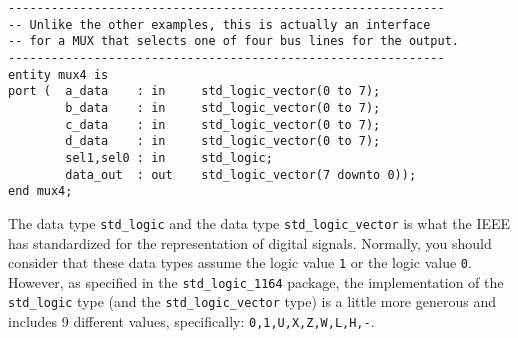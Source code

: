 \noindent
\begin{minipage}{0.99\linewidth}
\vspace{5pt}
\centering
{}
\begin{lstlisting}[label=entity_3, caption=Entity declaration with bundles.]
-------------------------------------------------------------
-- Unlike the other examples, this is actually an interface
-- for a MUX that selects one of four bus lines for the output.
-------------------------------------------------------------
entity mux4 is
port (  a_data    : in     std_logic_vector(0 to 7);
        b_data    : in     std_logic_vector(0 to 7);
        c_data    : in     std_logic_vector(0 to 7);
        d_data    : in     std_logic_vector(0 to 7);
        sel1,sel0 : in     std_logic;
        data_out  : out    std_logic_vector(7 downto 0));
end mux4;
\end{lstlisting}
\end{minipage}

The data type \texttt{std\_logic} and the data type \texttt{std\_logic\_vector} is what the IEEE has standardized for the representation of digital signals. Normally, you should consider that these data types assume the logic value \texttt{1} or the logic value \texttt{0}. However, as specified in the \texttt{std\_logic\_1164} package, the implementation of the \texttt{std\_logic} type (and the \texttt{std\_logic\_vector} type) is a little more generous and includes 9 different values, specifically: \texttt{0,1,U,X,Z,W,L,H,-}.

